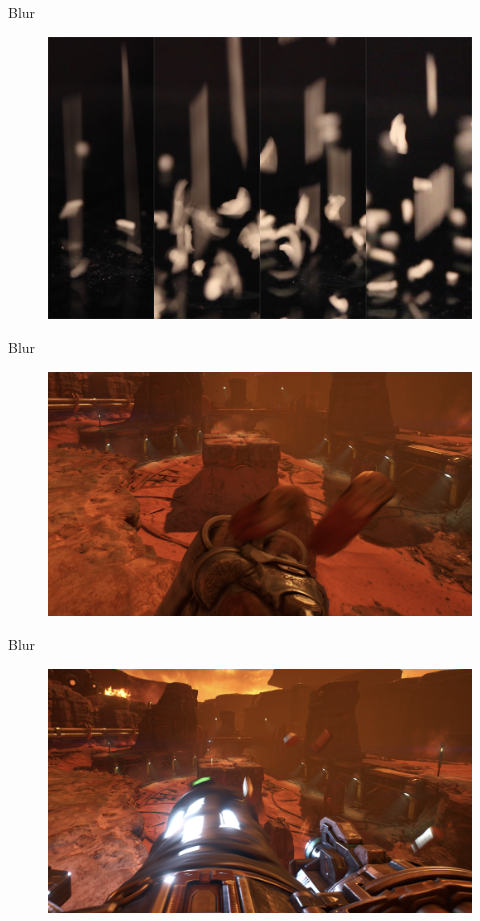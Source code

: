\documentclass[table]{beamer}
\begin{document}
\begin{frame}[fragile]{Blur}
    \begin{figure}
        \includegraphics[width=\linewidth]{./figures/shutter.jpg}
    \end{figure}
\end{frame}

\begin{frame}[fragile]{Blur}
    \begin{figure}
        \includegraphics[width=\linewidth]{./figures/doomblur1.png}
    \end{figure}
\end{frame}

\begin{frame}[fragile]{Blur}
    \begin{figure}
        \includegraphics[width=\linewidth]{./figures/doomblur2.png}
    \end{figure}
\end{frame}
\end{document}
